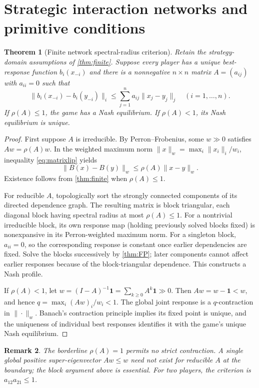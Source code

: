 \documentclass[11pt]{article}
\newtheorem{theorem}{Theorem}[section]
\newtheorem{remark}[theorem]{Remark}
\theoremstyle{definition}\newtheorem{definition}[theorem]{Definition}
\begin{document}
\section{Strategic interaction networks and primitive conditions}
\begin{theorem}[Finite network spectral-radius criterion\label{thm:spectral}]
Retain the strategy-domain assumptions of \cref{thm:finite}. Suppose every player has a unique best-response function $b_i(x_{-i})$ and there is a nonnegative $n\times n$ matrix $A=(a_{ij})$ with $a_{ii}=0$ such that
\begin{equation}\label{eq:matrixlip}
\|b_i(x_{-i})-b_i(y_{-i})\|_i\le\sum_{j=1}^n a_{ij}\|x_j-y_j\|_j
\quad(i=1,\ldots,n).
\end{equation}
If $\rho(A)\le1$, the game has a Nash equilibrium. If $\rho(A)<1$, its Nash equilibrium is unique.
\end{theorem}
\begin{proof}
First suppose $A$ is irreducible. By Perron--Frobenius, some $w\gg0$ satisfies $Aw=\rho(A)w$. In the weighted maximum norm $\|x\|_w=\max_i\|x_i\|_i/w_i$, inequality \eqref{eq:matrixlip} yields
\[\|B(x)-B(y)\|_w\le\rho(A)\|x-y\|_w.\]
Existence follows from \cref{thm:finite} when $\rho(A)\le1$.

For reducible $A$, topologically sort the strongly connected components of its directed dependence graph. The resulting matrix is block triangular, each diagonal block having spectral radius at most $\rho(A)\le1$. For a nontrivial irreducible block, its own response map (holding previously solved blocks fixed) is nonexpansive in its Perron-weighted maximum norm. For a singleton block, $a_{ii}=0$, so the corresponding response is constant once earlier dependencies are fixed. Solve the blocks successively by \cref{thm:FP}; later components cannot affect earlier responses because of the block-triangular dependence. This constructs a Nash profile.

If $\rho(A)<1$, let $w=(I-A)^{-1}\mathbf1=\sum_{k\ge0}A^k\mathbf1\gg0$. Then $Aw=w-\mathbf1<w$, and hence $q=\max_i(Aw)_i/w_i<1$. The global joint response is a $q$-contraction in $\|\cdot\|_w$. Banach's contraction principle implies its fixed point is unique, and the uniqueness of individual best responses identifies it with the game's unique Nash equilibrium.
\end{proof}
\begin{remark}
The borderline $\rho(A)=1$ permits no strict contraction. A \emph{single} global positive super-eigenvector $Aw\le w$ need not exist for reducible $A$ at the boundary; the block argument above is essential. For two players, the criterion is $a_{12}a_{21}\le1$.
\end{remark}
\end{document}
